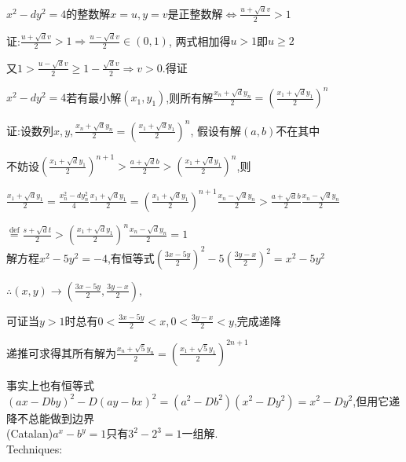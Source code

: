 $ x^2-dy^2=4$的整数解$ x=u,y=v$是正整数解$ \Leftrightarrow \frac{u+\sqrt{d}v}{2}>1$

证:$ \frac{u+\sqrt{d}v}{2}>1\Rightarrow \frac{u-\sqrt{d}v}{2}\in(0,1)$,
两式相加得$ u>1$即$ u\ge 2$

又$ 1>\frac{u-\sqrt{d}v}{2}\ge 1-\frac{\sqrt{d}v}{2}\Rightarrow v>0$.得证

$ x^2-dy^2=4$若有最小解$ (x_1,y_1)$,则所有解$ \frac{x_n+\sqrt{d}y_n}{2}=(\frac{x_1+\sqrt{d}y_1}{2})^n$

证:设数列$x,y, \frac{x_n+\sqrt{d}y_n}{2}=(\frac{x_1+\sqrt{d}y_1}{2})^n$,
假设有解$ (a,b)$不在其中

不妨设$ ( \frac{x_1+\sqrt{d}y_1}{2})^{n+1}>\frac{a+\sqrt{d}b}{2}>(\frac{x_1+\sqrt{d}y_1}{2})^n$,则

$   \frac{x_1+\sqrt{d}y_1}{2}=\frac{x_n^2-dy_n^2}{4}\frac{x_1+\sqrt{d}y_1}{2}=(\frac{x_1+\sqrt{d}y_1}{2})^{n+1}\frac{x_n-\sqrt{d}y_n}{2}>\frac{a+\sqrt{d}b}{2}\frac{x_n-\sqrt{d}y_n}{2} $ 

$  \overset{\text{def}}{=} \frac{s+\sqrt{d}t}{2}>(\frac{x_1+\sqrt{d}y_1}{2})^n\frac{x_n-\sqrt{d}y_n}{2}=1$ 
\\

解方程$ x^2-5y^2=-4$,有恒等式$ (\frac{3x-5y}{2})^2-5(\frac{3y-x}{2})^2=x^2-5y^2$

$ \therefore (x,y)\rightarrow (\frac{3x-5y}{2},\frac{3y-x}{2}),$

可证当$ y>1$时总有$ 0<\frac{3x-5y}{2}<x,0<\frac{3y-x}{2}<y$,完成递降

递推可求得其所有解为$ \frac{x_n+\sqrt{5}y_n}{2}=(\frac{x_1+\sqrt{5}y_1}{2})^{2n+1}$

事实上也有恒等式$ (ax-Dby)^2-D(ay-bx)^2=(a^2-Db^2)(x^2-Dy^2)=x^2-Dy^2$,但用它递降不总能做到边界
\\

(Catalan)$ a^x-b^y=1$只有$ 3^2-2^3=1$一组解.
\\

Techniques:

